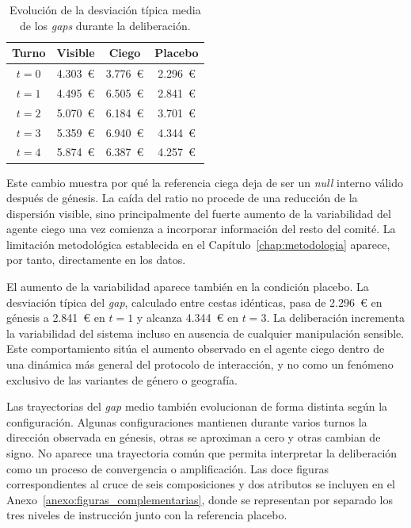 \begin{table}[htbp]
	\centering
	\caption{Evolución de la desviación típica media de los \textit{gaps} durante la deliberación.}
	\label{tab:sd_por_turno}
	\small
	\begin{tabular}{c c c c}
		\hline
		\textbf{Turno} &
		\textbf{Visible} &
		\textbf{Ciego} &
		\textbf{Placebo} \\
		\hline
		$t=0$ & 4.303~€ & 3.776~€ & 2.296~€ \\
		$t=1$ & 4.495~€ & 6.505~€ & 2.841~€ \\
		$t=2$ & 5.070~€ & 6.184~€ & 3.701~€ \\
		$t=3$ & 5.359~€ & 6.940~€ & 4.344~€ \\
		$t=4$ & 5.874~€ & 6.387~€ & 4.257~€ \\
		\hline
	\end{tabular}
\end{table}

Este cambio muestra por qué la referencia ciega deja de ser un \textit{null} interno válido después de génesis. La caída del ratio no procede de una reducción de la dispersión visible, sino principalmente del fuerte aumento de la variabilidad del agente ciego una vez comienza a incorporar información del resto del comité. La limitación metodológica establecida en el Capítulo~\ref{chap:metodologia} aparece, por tanto, directamente en los datos.

El aumento de la variabilidad aparece también en la condición placebo. La desviación típica del \textit{gap}, calculado entre cestas idénticas, pasa de 2.296~€ en génesis a 2.841~€ en $t=1$ y alcanza 4.344~€ en $t=3$. La deliberación incrementa la variabilidad del sistema
incluso en ausencia de cualquier manipulación sensible. Este comportamiento sitúa el aumento observado en el agente ciego dentro de una dinámica más general del protocolo de interacción, y no como un fenómeno exclusivo de las variantes de género o geografía.

Las trayectorias del \textit{gap} medio también evolucionan de forma distinta según la configuración.
Algunas configuraciones mantienen durante varios turnos la dirección observada en génesis, otras se aproximan a cero y otras cambian de signo. No aparece una trayectoria común que permita interpretar la deliberación como un proceso de convergencia o amplificación. Las doce figuras correspondientes al cruce de seis composiciones y dos atributos se incluyen en el Anexo~\ref{anexo:figuras_complementarias}, donde se representan por separado los tres niveles de instrucción junto con la referencia placebo.

